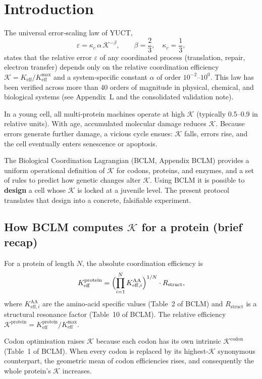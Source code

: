 \documentclass[12pt,a4paper]{article}
\newcommand{\REL}{\mathcal{K}}          %
\begin{document}
	\section{Introduction}
	\label{sec:intro}
	The universal error‑scaling law of YUCT,
	\begin{equation}
		\varepsilon = \kappa_c \, \alpha \, \REL^{-\beta}, \qquad \beta = \frac{2}{3},\quad \kappa_c = \frac{1}{3},
		\label{eq:error-law}
	\end{equation}
	states that the relative error \(\varepsilon\) of any coordinated process (translation, repair, electron transfer) depends only on the relative coordination efficiency \(\REL = K_{\mathrm{eff}}/K_{\mathrm{eff}}^{\max}\) and a system‑specific constant \(\alpha\) of order \(10^{-2}\)–\(10^{0}\). This law has been verified across more than 40 orders of magnitude in physical, chemical, and biological systems (see Appendix~L and the consolidated validation note).
	
	In a young cell, all multi‑protein machines operate at high \(\REL\) (typically 0.5–0.9 in relative units). With age, accumulated molecular damage reduces \(\REL\). Because errors generate further damage, a vicious cycle ensues: \(\REL\) falls, errors rise, and the cell eventually enters senescence or apoptosis.
	
	The Biological Coordination Lagrangian (BCLM, Appendix BCLM) provides a uniform operational definition of \(\REL\) for codons, proteins, and enzymes, and a set of rules to predict how genetic changes alter \(\REL\). Using BCLM it is possible to \textbf{design} a cell whose \(\REL\) is locked at a juvenile level. The present protocol translates that design into a concrete, falsifiable experiment.
	
	\subsection{How BCLM computes \(\REL\) for a protein (brief recap)}
	For a protein of length \(N\), the absolute coordination efficiency is
	\[
	K_{\mathrm{eff}}^{\mathrm{protein}} = \Bigl( \prod_{i=1}^{N} K_{\mathrm{eff},i}^{\mathrm{AA}} \Bigr)^{1/N} \cdot R_{\mathrm{struct}},
	\]
	where \(K_{\mathrm{eff},i}^{\mathrm{AA}}\) are the amino‑acid specific values (Table~2 of BCLM) and \(R_{\mathrm{struct}}\) is a structural resonance factor (Table~10 of BCLM). The relative efficiency \(\REL^{\mathrm{protein}} = K_{\mathrm{eff}}^{\mathrm{protein}}/K_{\mathrm{eff}}^{\max}\).
	
	Codon optimisation raises \(\REL\) because each codon has its own intrinsic \(\REL^{\mathrm{codon}}\) (Table~1 of BCLM). When every codon is replaced by its highest‑\(\REL\) synonymous counterpart, the geometric mean of codon efficiencies rises, and consequently the whole protein’s \(\REL\) increases.
	
\end{document}
